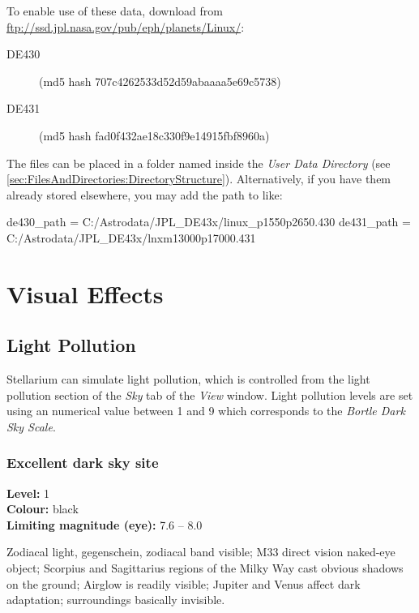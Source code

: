 To enable use of these data, download from \url{ftp://ssd.jpl.nasa.gov/pub/eph/planets/Linux/}:

\begin{description}
\item[DE430]  (md5 hash 707c4262533d52d59abaaaa5e69c5738)
\item[DE431]  (md5 hash fad0f432ae18c330f9e14915fbf8960a)
\end{description}


The files can be placed in a folder named  inside the
\emph{User Data Directory} (see
\ref{sec:FilesAndDirectories:DirectoryStructure}). Alternatively, if
you have them already stored elsewhere, you may add the path to
 like:

\begin{configfile}
[astro]
de430_path = C:/Astrodata/JPL_DE43x/linux_p1550p2650.430
de431_path = C:/Astrodata/JPL_DE43x/lnxm13000p17000.431
\end{configfile}



\chapter{Visual Effects}\label{visual-effects}

\section{Light Pollution}\label{light-pollution}

Stellarium can simulate light pollution, which is controlled from the
light pollution section of the \emph{Sky} tab of the \emph{View} window.
Light pollution levels are set using an numerical value between 1 and 9
which corresponds to the \emph{Bortle Dark Sky Scale}.

\subsection{Excellent dark sky site}
\textbf{Level:} 1 \\
\textbf{Colour:} black \\
\textbf{Limiting magnitude (eye):} 7.6 -- 8.0

Zodiacal light, gegenschein, zodiacal band visible; M33 direct vision naked-eye object; Scorpius and Sagittarius regions of the Milky Way cast obvious shadows on the ground; Airglow is readily visible; Jupiter and Venus affect dark adaptation; surroundings basically invisible.

